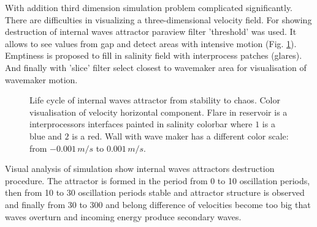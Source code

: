 \documentclass[a4wide,fontsize=12pt]{article}
\begin{document}
With addition third dimension simulation problem complicated significantly. There are difficulties in visualizing a three-dimensional velocity field. For showing destruction of internal waves attractor paraview filter 'threshold' was used. It allows to see values from gap and detect areas with intensive motion (Fig. \ref{fig:3DLocTurbRes}). Emptiness is proposed to fill in salinity field with interprocess patches (glares). And finally with 'slice' filter select closest to wavemaker area for visualisation of wavemaker motion. 



\begin{figure}[!ht]
\centering
    \begin{minipage}{0.45\textwidth}
        \centering
        \label{fig:3DTurbBegin}
    \end{minipage}
    \begin{minipage}{0.45\textwidth}
        \centering
        \label{fig:3DTurbEnd}
    \end{minipage}
    \caption{Life cycle of internal waves attractor from stability to chaos. Color visualisation of velocity horizontal component. Flare in reservoir is a interprocessors interfaces painted in salinity colorbar where $1$ is a blue and $2$ is a red. Wall with wave maker has a different color scale: from $-0.001\,m/s$ to $0.001\,m/s$.}
    \label{fig:3DLocTurbRes}
\end{figure}

    Visual analysis of simulation show internal waves attractors destruction procedure. The attractor is formed in the period from 0 to 10 oscillation periods, then from 10 to 30 oscillation periods stable and attractor structure is observed and finally from 30 to 300 and belong difference of velocities become too big that waves overturn and incoming energy produce secondary waves.
\end{document}
